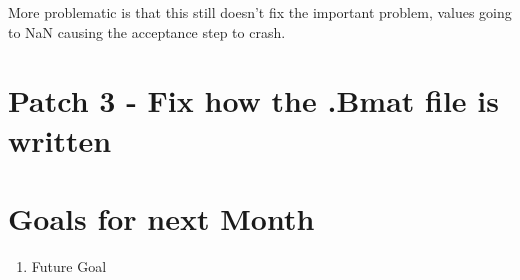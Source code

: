 More problematic is that this still doesn't fix the important problem, values going to NaN causing the acceptance step to crash.


\section{Patch 3 - Fix how the .Bmat file is written}




\section{Goals for next Month}
\begin{enumerate}
\item Future Goal
\end{enumerate}


